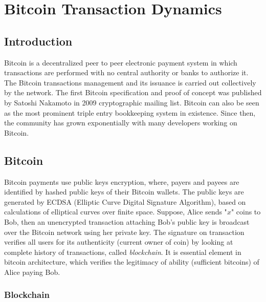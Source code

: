 \chapter{Bitcoin Transaction Dynamics } %

\label{Chapter2} %


\section{Introduction}

Bitcoin is a decentralized peer to peer electronic payment system in which transactions are performed with no central authority or banks to authorize it. The Bitcoin transactions management and its issuance is carried out collectively by the network. The first Bitcoin specification and proof of concept was published by Satoshi Nakamoto \citep{Nakamoto2008} in 2009 cryptographic mailing list. Bitcoin can also be seen as the most prominent triple entry bookkeeping system in existence. Since then, the community has grown exponentially with many developers working on Bitcoin.


\section{Bitcoin}
\label{sec:bitcoin}
Bitcoin payments use public keys encryption, where, payers and payees are identified by hashed public keys of their Bitcoin wallets. The public keys are generated by ECDSA (Elliptic Curve Digital Signature Algorithm), based on calculations of elliptical curves over finite space. Suppose, Alice sends "$x$" coins to Bob, then an unencrypted transaction attaching Bob's public key is broadcast over the Bitcoin network using her private key. The signature on transaction verifies all users for its authenticity (current owner of coin) by looking at complete history of transactions, called {\it blockchain}. It is essential element in bitcoin architecture, which verifies the legitimacy of ability (sufficient bitcoins) of Alice paying Bob.

\subsection{Blockchain}


